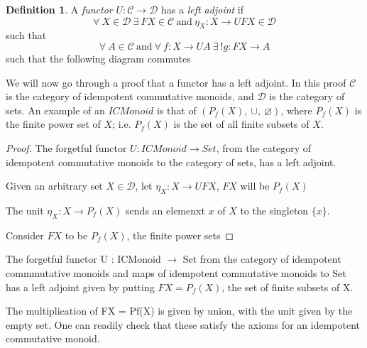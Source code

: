 \documentclass{article}
\theoremstyle{definition}
\newtheorem{definition}{Definition}[section]
\begin{document}
\begin{definition}
    A \textit{functor} $U : \mathcal{C} \rightarrow \mathcal{D}$ has a \textit{left adjoint} if
        $$
        \forall\ X \in \mathcal{D}
        \ \exists
        \ FX \in \mathcal{C} \ \textrm{and}\ \eta_X : X \rightarrow UFX \in \mathcal{D}
        $$
        such that
        $$
        \forall\ A \in \mathcal{C}\ \textrm{and}\ \forall\ f : X \rightarrow UA
        \ \exists
        \ !g : FX \rightarrow A
        $$
        such that the following diagram commutes
\end{definition}

\begin{center}
\end{center}

We will now go through a proof that a functor has a left adjoint.
In this proof $\mathcal{C}$ is the category of idempotent commutative monoids,
and $\mathcal{D}$ is the category of sets.
An example of an $ICMonoid$ is that of $(P_f(X),\ \cup,\ \varnothing)$,
where $P_f(X)$ is the finite power set of $X$;
i.e. $P_f(X)$ is the set of all finite subsets of $X$.

\begin{proof}
    The forgetful functor $U : ICMonoid \rightarrow Set$,
    from the category of idempotent commutative monoids
    to the category of sets,
    has a left adjoint.

    Given an arbitrary set $X \in \mathcal{D}$,
    let $\eta_X : X \rightarrow UFX$,
    $FX$ will be $P_f(X)$

    The unit $\eta_X : X \rightarrow P_f(X)$ sends an elemenxt $x$ of $X$ to the singleton $\{x\}$.

    Consider $FX$ to be $P_f(X)$, the finite power sets




\end{proof}


The forgetful functor U : ICMonoid $\rightarrow$ Set
from the category of idempotent commmutative monoids and maps of idempotent commutative monoids
to Set has a left adjoint given by putting $FX = P_f(X)$,
the set of finite subsets of X.
\vspace{5mm}

The multiplication of FX = Pf(X) is given by union,
with the unit given by the empty set.
One can readily check that these satisfy the axioms for an idempotent commutative monoid.
\vspace{5mm}
\end{document}
